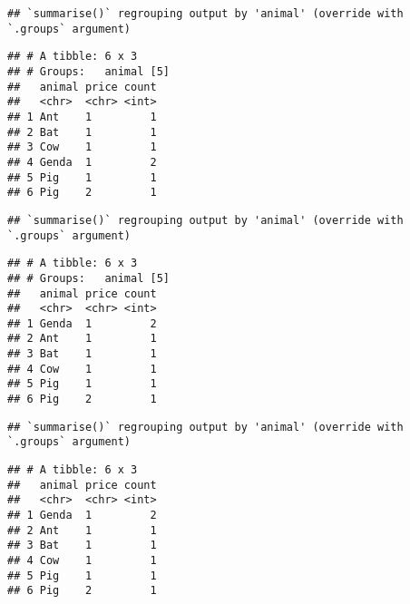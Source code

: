 \documentclass[
]{article}
\begin{document}
\begin{verbatim}
## `summarise()` regrouping output by 'animal' (override with `.groups` argument)
\end{verbatim}

\begin{verbatim}
## # A tibble: 6 x 3
## # Groups:   animal [5]
##   animal price count
##   <chr>  <chr> <int>
## 1 Ant    1         1
## 2 Bat    1         1
## 3 Cow    1         1
## 4 Genda  1         2
## 5 Pig    1         1
## 6 Pig    2         1
\end{verbatim}

\begin{verbatim}
## `summarise()` regrouping output by 'animal' (override with `.groups` argument)
\end{verbatim}

\begin{verbatim}
## # A tibble: 6 x 3
## # Groups:   animal [5]
##   animal price count
##   <chr>  <chr> <int>
## 1 Genda  1         2
## 2 Ant    1         1
## 3 Bat    1         1
## 4 Cow    1         1
## 5 Pig    1         1
## 6 Pig    2         1
\end{verbatim}

\begin{verbatim}
## `summarise()` regrouping output by 'animal' (override with `.groups` argument)
\end{verbatim}

\begin{verbatim}
## # A tibble: 6 x 3
##   animal price count
##   <chr>  <chr> <int>
## 1 Genda  1         2
## 2 Ant    1         1
## 3 Bat    1         1
## 4 Cow    1         1
## 5 Pig    1         1
## 6 Pig    2         1
\end{verbatim}
\end{document}

